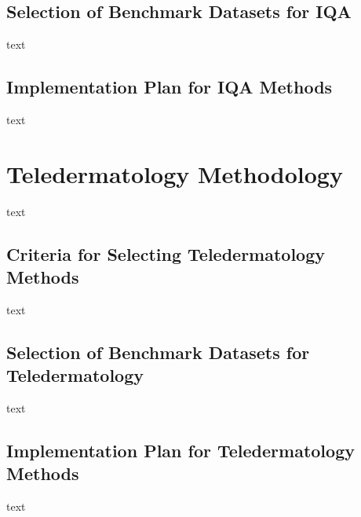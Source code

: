 \subsection{Selection of Benchmark Datasets for IQA}
\label{sub:SelectionBenchmarkDatasetsIQA}
text \par
\vspace{\baselineskip}
\noindent

\subsection{Implementation Plan for IQA Methods}
\label{sub:ImplementationPlanIQA}
text \par
\vspace{\baselineskip}
\noindent

\section{Teledermatology Methodology}
\label{sec:TeledermatologyMethodology}
text \par
\vspace{\baselineskip}
\noindent

\subsection{Criteria for Selecting Teledermatology Methods}
\label{sub:CriteriaSelectingTeledermatology}
text \par
\vspace{\baselineskip}
\noindent

\subsection{Selection of Benchmark Datasets for Teledermatology}
\label{sub:SelectionBenchmarkDatasetsTeledermatology}
text \par
\vspace{\baselineskip}
\noindent

\subsection{Implementation Plan for Teledermatology Methods}
\label{sub:ImplementationPlanTeledermatology}
text \par
\vspace{\baselineskip}
\noindent